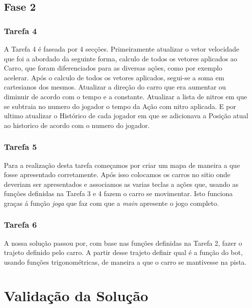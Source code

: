 \documentclass[a4paper]{report} %
\begin{document}
\section{Fase 2}
\label{sec:solucaofase2}

\subsection{Tarefa 4}
\label{subsec:solucaotarefa4}
A Tarefa 4 é faseada por 4 secções.
Primeiramente atualizar o vetor velocidade que foi a abordado da seguinte forma, calculo de todos os vetores aplicados ao Carro, que foram diferenciados para as diversas ações, como por exemplo acelerar. Após o calculo de todos os vetores aplicados, segui-se a soma em cartesianos dos mesmos.
Atualizar a direção do carro que era aumentar ou diminuir de acordo com o tempo e a constante.
Atualizar a lista de nitros em que se subtraia no numero do jogador o tempo da Ação com nitro aplicada.
E por ultimo atualizar o Histórico de cada jogador em que se adicionava a Posição atual ao historico de acordo com o numero do jogador.

\subsection{Tarefa 5}
\label{subsec:solucaotarefa5}
Para a realização desta tarefa começamos por criar um mapa de maneira a que fosse apresentado corretamente. Após isso colocamos os carros no sitio onde deveriam ser apresentados e associamos as varias teclas a ações que, usando as funções definidas na Tarefa 3 e 4 fazem o carro se movimentar.
Isto funciona graças á função {\color{blue}\emph{joga}} que faz com que a {\color{blue}\emph{main}} apresente o jogo completo.

\subsection{Tarefa 6}
\label{subsec:solucaotarefa6}
A nossa solução passou por, com base nas funções definidas na Tarefa 2, fazer o trajeto definido pelo carro. A partir desse trajeto definir qual é a função do bot, usando funções trigonométricas, de maneira a que o carro se mantivesse na pista.

\chapter{Validação da Solução}
\end{document}
